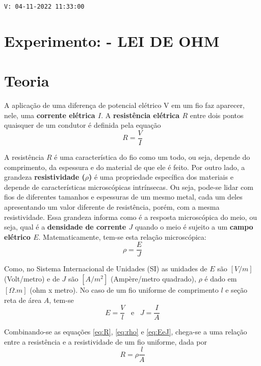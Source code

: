 \noindent \texttt{V: 04-11-2022 11:33:00}

\section*{Experimento: - LEI DE OHM}
\section*{Teoria}

A aplicação de uma diferença de potencial elétrico V em um fio faz aparecer, nele, uma \textbf{corrente elétrica $I$}. A \textbf{resistência elétrica $R$} entre dois pontos quaisquer de um condutor é definida pela equação
\begin{equation}
    R = \frac{V}{I}
    \label{eq:R}
\end{equation}

\noindent A resistência $R$ é uma característica do fio como um todo, ou seja, depende do comprimento, da espessura e do material de que ele é feito. Por outro lado, a grandeza \textbf{resistividade ($\rho$)} é uma propriedade {\color{red}específica dos materiais} e depende de características microscópicas intrínsecas. Ou seja, pode-se lidar com fios de diferentes tamanhos e espessuras de um mesmo metal, cada um deles apresentando um valor diferente de resistência, porém, com a mesma resistividade. Essa grandeza informa como é a resposta microscópica do meio, ou seja, qual é a \textbf{densidade de corrente $J$} quando o meio é sujeito a um \textbf{campo elétrico $E$}. Matematicamente, tem-se esta relação microscópica:
\begin{equation}
    \rho = \frac{E}{J}
    \label{eq:rho}
\end{equation}

\noindent Como, no Sistema Internacional de Unidades (SI) as unidades de $E$ são $[V/m]$ (Volt/metro) e de $J$ são $[A/m^{2}]$ (Ampère/metro quadrado), $\rho$ é dado em $[\Omega.m]$ (ohm x metro).
No caso de um fio uniforme de comprimento $l$ e seção reta de área $A$, tem-se
\begin{equation}
    E = \frac{V}{l} \;\;\; \text{e} \;\;\; J = \frac{I}{A}
    \label{eq:EeJ}
\end{equation}

\noindent 
Combinando-se as equações \ref{eq:R}, \ref{eq:rho} e \ref{eq:EeJ}, chega-se a uma relação entre a resistência e a resistividade de um fio uniforme, dada por 
\begin{equation}
    R = \rho \frac{l}{A}
\end{equation}


